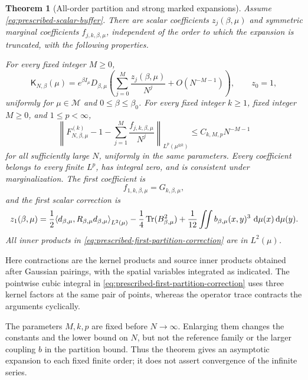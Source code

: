 \documentclass[11pt,reqno]{amsart}
\numberwithin{equation}{section}
\theoremstyle{plain}
\newtheorem{thm}{Theorem}[section]
\theoremstyle{definition}
\DeclarePairedDelimiter{\ip}{\langle}{\rangle}
\newcommand{\dd}{\mathop{}\!\mathrm d}
\newcommand{\Tr}{\operatorname{Tr}}
\newcommand{\be}{\beta}
\newcommand{\K}{\mathsf K}
\begin{document}
\begin{thm}[All-order partition and strong marked expansions]
\label{thm:prescribed-marked-expansion}
Assume \eqref{eq:prescribed-scalar-buffer}.  There are scalar coefficients $z_j(\be,\mu)$ and symmetric marginal coefficients $f_{j,k,\be,\mu}$, independent of the order to which the expansion is truncated, with the following properties.

For every fixed integer $M\geq0$,
\begin{equation}
 \K_{N,\be}(\mu)
 =e^{\be I_{\mu}}D_{\be,\mu}
 \left(\sum_{j=0}^{M}\frac{z_j(\be,\mu)}{N^j}
 +O(N^{-M-1})\right),
 \qquad z_0=1,
 \label{eq:prescribed-partition-expansion}
\end{equation}
uniformly for $\mu\in\mathscr M$ and $0\leq\be\leq\be_0$.  For every fixed integer $k\geq1$, fixed integer $M\geq0$, and $1\leq p<\infty$,
\begin{equation}
 \left\|F_{N,\be,\mu}^{(k)}-1
 -\sum_{j=1}^{M}\frac{f_{j,k,\be,\mu}}{N^j}\right\|_{L^p(\mu^{\otimes k})}
 \leq C_{k,M,p}N^{-M-1}
 \label{eq:prescribed-marginal-expansion}
\end{equation}
for all sufficiently large $N$, uniformly in the same parameters.  Every coefficient belongs to every finite $L^p$, has integral zero, and is consistent under marginalization.  The first coefficient is
\begin{equation}
 f_{1,k,\be,\mu}=G_{k,\be,\mu},
 \label{eq:prescribed-first-coefficient}
\end{equation}
and the first scalar correction is
\begin{equation}
 z_1(\be,\mu)
 =\frac12\ip*{d_{\be,\mu},R_{\be,\mu}d_{\be,\mu}}_{L^2(\mu)}
 -\frac14\Tr(B_{\be,\mu}^2)
 +\frac1{12}\iint b_{\be,\mu}(x,y)^3\,\dd\mu(x)\dd\mu(y).
 \label{eq:prescribed-first-partition-correction}
\end{equation}
All inner products in \eqref{eq:prescribed-first-partition-correction} are in $L^2(\mu)$.
\end{thm}

Here contractions are the kernel products and source inner products obtained after Gaussian pairings, with the spatial variables integrated as indicated. The pointwise cubic integral in \eqref{eq:prescribed-first-partition-correction} uses three kernel factors at the same pair of points, whereas the operator trace contracts the arguments cyclically.

The parameters $M,k,p$ are fixed before $N\to\infty$. Enlarging them changes the constants and the lower bound on $N$, but not the reference family or the larger coupling $b$ in the partition bound. Thus the theorem gives an asymptotic expansion to each fixed finite order; it does not assert convergence of the infinite series.
\end{document}
